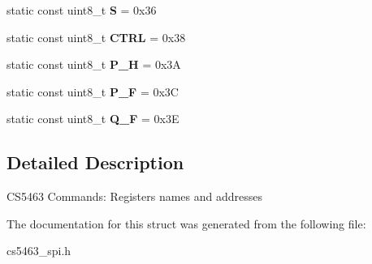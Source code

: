 \begin{DoxyCompactItemize}
\item 
\hypertarget{structRegReadCmd_a4781221e4e2aceae1ecb5678d9212b4f}{static const uint8\-\_\-t {\bfseries S} = 0x36}\label{structRegReadCmd_a4781221e4e2aceae1ecb5678d9212b4f}

\item 
\hypertarget{structRegReadCmd_a2aced4ef775b789cded881d9da1c1b9b}{static const uint8\-\_\-t {\bfseries C\-T\-R\-L} = 0x38}\label{structRegReadCmd_a2aced4ef775b789cded881d9da1c1b9b}

\item 
\hypertarget{structRegReadCmd_a43f72a88114e4a41543252499e02c880}{static const uint8\-\_\-t {\bfseries P\-\_\-\-H} = 0x3\-A}\label{structRegReadCmd_a43f72a88114e4a41543252499e02c880}

\item 
\hypertarget{structRegReadCmd_a898b3a1ccdb42af6f80dcb6fc5554200}{static const uint8\-\_\-t {\bfseries P\-\_\-\-F} = 0x3\-C}\label{structRegReadCmd_a898b3a1ccdb42af6f80dcb6fc5554200}

\item 
\hypertarget{structRegReadCmd_a9ae5fd5aa61421fe0894e09087f52f1d}{static const uint8\-\_\-t {\bfseries Q\-\_\-\-F} = 0x3\-E}\label{structRegReadCmd_a9ae5fd5aa61421fe0894e09087f52f1d}

\end{DoxyCompactItemize}


\subsection{Detailed Description}
C\-S5463 Commands\-: Registers names and addresses 

The documentation for this struct was generated from the following file\-:\begin{DoxyCompactItemize}
\item 
cs5463\-\_\-spi.\-h\end{DoxyCompactItemize}
